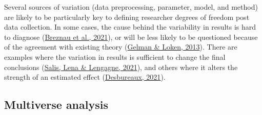 \documentclass[10pt,a4paper]{article}
\begin{document}
Several sources of variation (data preprocessing, parameter, model, and method) are likely to be particularly key to defining researcher degrees of freedom post data collection.
In some cases, the cause behind the variability in results is hard to diagnose (\protect\hyperlink{ref-breznau_observing_2021}{Breznau et al., 2021}), or will be less likely to be questioned because of the agreement with existing theory (\protect\hyperlink{ref-gelman_garden_2013}{Gelman \& Loken, 2013}).
There are examples where the variation in results is sufficient to change the final conclusions (\protect\hyperlink{ref-salis_how_2021}{Salis, Lena \& Lengagne, 2021}), and others where it alters the strength of an estimated effect (\protect\hyperlink{ref-desbureaux_subjective_2021}{Desbureaux, 2021}).

\hypertarget{multiverse-analysis}{%
\subsection{Multiverse analysis}\label{multiverse-analysis}}
\end{document}

